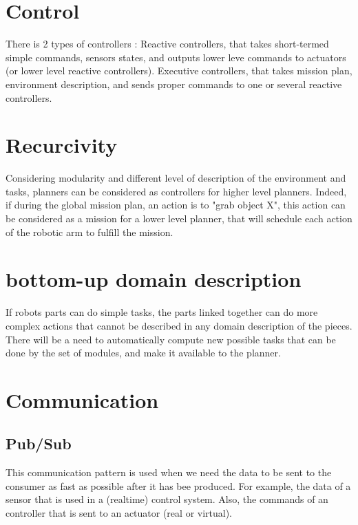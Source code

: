 \documentclass[conference]{IEEEtran}
\begin{document}
\section{Control}

There is 2 types of controllers : 
Reactive controllers, that takes short-termed simple commands, sensors states, and outputs lower leve commands to actuators (or lower level reactive controllers).
Executive controllers, that takes mission plan, environment description, and sends proper commands to one or several reactive controllers.

\section{Recurcivity}

Considering modularity and different level of description of the environment and tasks, planners can be considered as controllers for higher level planners.
Indeed, if during the global mission plan, an action is to "grab object X", this action can be considered as a mission for a lower level planner, that will schedule each action of the robotic arm to fulfill the mission.

\section{bottom-up domain description}

If robots parts can do simple tasks, the parts linked together can do more complex actions that cannot be described in any domain description of the pieces.
There will be a need to automatically compute new possible tasks that can be done by the set of modules, and make it available to the planner.

\section{Communication}

\subsection{Pub/Sub}

This communication pattern is used when we need the data to be sent to the consumer as fast as possible after it has bee produced.
For example, the data of a sensor that is used in a (realtime) control system.
Also, the commands of an controller that is sent to an actuator (real or virtual).
\end{document}
